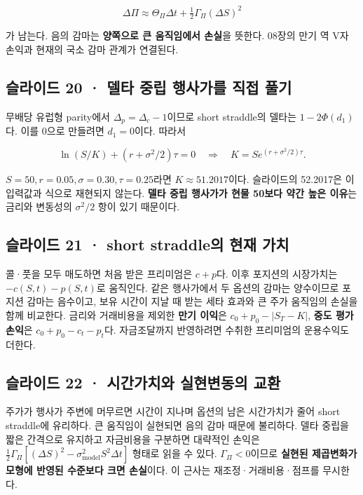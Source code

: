 \documentclass[11pt,a4paper]{article}
\begin{document}
\[
\Delta\Pi\approx\Theta_\Pi\Delta t
+\tfrac12\Gamma_\Pi(\Delta S)^2
\]

가 남는다. 음의 감마는 \textbf{양쪽으로 큰 움직임에서 손실}을 뜻한다. 08장의 만기 역 V자 손익과 현재의 국소 감마 관계가 연결된다.\par

\subsection{슬라이드 20 · 델타 중립 행사가를 직접 풀기}
무배당 유럽형 parity에서 $\Delta_p=\Delta_c-1$이므로 short straddle의 델타는 $1-2\Phi(d_1)$다. 이를 0으로 만들려면 $d_1=0$이다. 따라서\par

\[
\ln(S/K)+(r+\sigma^2/2)\tau=0
\quad\Longrightarrow\quad
K=S e^{(r+\sigma^2/2)\tau}.
\]

$S=50,r=0.05,\sigma=0.30,\tau=0.25$라면 $K\approx51.2017$이다. 슬라이드의 52.2017은 이 입력값과 식으로 재현되지 않는다. \textbf{델타 중립 행사가가 현물 50보다 약간 높은 이유}는 금리와 변동성의 $\sigma^2/2$ 항이 있기 때문이다.\par

\subsection{슬라이드 21 · short straddle의 현재 가치}
콜·풋을 모두 매도하면 처음 받은 프리미엄은 $c+p$다. 이후 포지션의 시장가치는 $-c(S,t)-p(S,t)$로 움직인다. 같은 행사가에서 두 옵션의 감마는 양수이므로 포지션 감마는 음수이고, 보유 시간이 지날 때 받는 세타 효과와 큰 주가 움직임의 손실을 함께 비교한다. 금리와 거래비용을 제외한 \textbf{만기 이익}은 $c_0+p_0-|S_T-K|$, \textbf{중도 평가손익}은 $c_0+p_0-c_t-p_t$다. 자금조달까지 반영하려면 수취한 프리미엄의 운용수익도 더한다.\par

\subsection{슬라이드 22 · 시간가치와 실현변동의 교환}
주가가 행사가 주변에 머무르면 시간이 지나며 옵션의 남은 시간가치가 줄어 short straddle에 유리하다. 큰 움직임이 실현되면 음의 감마 때문에 불리하다. 델타 중립을 짧은 간격으로 유지하고 자금비용을 구분하면 대략적인 손익은 $\frac12\Gamma_\Pi[(\Delta S)^2-\sigma_{\mathrm{model}}^2S^2\Delta t]$ 형태로 읽을 수 있다. $\Gamma_\Pi<0$이므로 \textbf{실현된 제곱변화가 모형에 반영된 수준보다 크면 손실}이다. 이 근사는 재조정·거래비용·점프를 무시한다.\par
\end{document}
